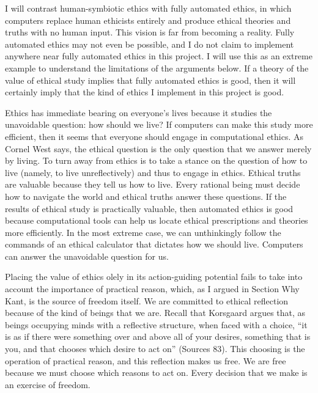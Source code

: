 \begin{isabellebody}
\begin{isamarkuptext}
I will contrast human-symbiotic ethics with fully automated ethics, in which computers replace human
ethicists entirely and produce ethical theories and truths with no human input. This vision is far
from becoming a reality. Fully automated ethics may not even be possible, and I do not claim to implement 
anywhere near fully automated ethics in this project. I will use this as an extreme example to understand
the limitations of the arguments below. If a theory of the value of ethical study implies that 
fully automated ethics is good, then it will certainly imply that the kind of ethics I implement
in this project is good.%
\end{isamarkuptext}\isamarkuptrue%
%
\isadelimdocument
%
\endisadelimdocument
%
\isatagdocument
%
\isamarkuptrue%
%
\endisatagdocument
{\isafolddocument}%
%
\isadelimdocument
%
\endisadelimdocument
%
\begin{isamarkuptext}%
Ethics has immediate bearing on everyone’s lives because it studies the unavoidable question: 
how should we live? If computers can make this study more efficient, then it seems that everyone should
engage in computational ethics. As Cornel West says, the ethical question is the only question that 
we answer merely by living. To turn away from ethics is to take a stance on the question of how to 
live (namely, to live unreflectively) and thus to engage in ethics. Ethical truths are valuable because 
they tell us how to live. Every rational being must decide how to navigate the world and ethical 
truths answer these questions. If the results of ethical study is practically valuable, then automated 
ethics is good because computational tools can help us locate ethical prescriptions and theories more efficiently. 
In the most extreme case, we can unthinkingly follow the commands of an ethical calculator that dictates 
how we should live. Computers can answer the unavoidable question for us.

Placing the value of ethics olely in its action-guiding potential fails to take into account the 
importance of practical reason, which, as I argued in Section Why Kant, is the source
of freedom itself. 
We are committed to ethical reflection because of the kind of beings that we are. Recall that Korsgaard 
argues that, as beings occupying minds with a reflective structure, when faced with a choice, “it is as if there 
were something over and above all of your desires, something that is you, and that chooses which desire 
to act on” (Sources 83). This choosing is the operation of practical reason, and this reflection
makes us free. We are free because we must choose which reasons to act on. Every decision that we 
make is an exercise of freedom. 


\end{isamarkuptext}
\end{isabellebody}
